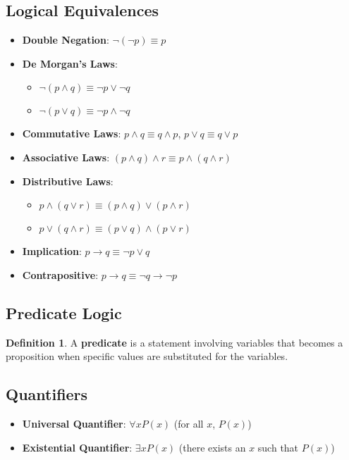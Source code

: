 \documentclass[11pt]{article}
\theoremstyle{definition}
\newtheorem{definition}{Definition}[section]
\begin{document}
\subsection{Logical Equivalences}
\begin{itemize}
    \item \textbf{Double Negation}: $\neg(\neg p) \equiv p$
    \item \textbf{De Morgan's Laws}: 
        \begin{itemize}
            \item $\neg(p \land q) \equiv \neg p \lor \neg q$
            \item $\neg(p \lor q) \equiv \neg p \land \neg q$
        \end{itemize}
    \item \textbf{Commutative Laws}: $p \land q \equiv q \land p$, $p \lor q \equiv q \lor p$
    \item \textbf{Associative Laws}: $(p \land q) \land r \equiv p \land (q \land r)$
    \item \textbf{Distributive Laws}: 
        \begin{itemize}
            \item $p \land (q \lor r) \equiv (p \land q) \lor (p \land r)$
            \item $p \lor (q \land r) \equiv (p \lor q) \land (p \lor r)$
        \end{itemize}
    \item \textbf{Implication}: $p \rightarrow q \equiv \neg p \lor q$
    \item \textbf{Contrapositive}: $p \rightarrow q \equiv \neg q \rightarrow \neg p$
\end{itemize}

\subsection{Predicate Logic}
\begin{definition}
A \textbf{predicate} is a statement involving variables that becomes a proposition when specific values are substituted for the variables.
\end{definition}

\subsection{Quantifiers}
\begin{itemize}
    \item \textbf{Universal Quantifier}: $\forall x P(x)$ (for all $x$, $P(x)$)
    \item \textbf{Existential Quantifier}: $\exists x P(x)$ (there exists an $x$ such that $P(x)$)
\end{itemize}
\end{document}
